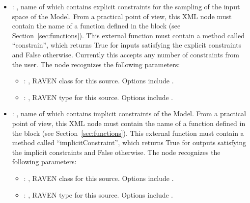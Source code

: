 \begin{itemize}
    \item {}: ,
      name of  which contains explicit constraints for the sampling of
      the input space of the Model. From a practical point of view, this XML node must contain
      the name of a function defined in the  block (see
      Section~\ref{sec:functions}).               This external function must contain a method
      called ``constrain'', which returns True for               inputs satisfying the explicit
      constraints and False otherwise. \nb Currently this accepts any number of constraints from the
      user.
      The  node recognizes the following parameters:
        \begin{itemize}
          \item {}: ,
            RAVEN class for this source. Options include .
          \item {}: ,
            RAVEN type for this source. Options include .
      \end{itemize}

    \item {}: ,
      name of  which contains implicit constraints of the Model. From a practical
      point of view, this XML node must contain the name of a function defined in the
                     block (see Section~\ref{sec:functions}). This external
      function must contain a method called         ``implicitConstraint'', which returns True for
      outputs satisfying the implicit constraints and False otherwise.
      The  node recognizes the following parameters:
        \begin{itemize}
          \item {}: ,
            RAVEN class for this source. Options include .
          \item {}: ,
            RAVEN type for this source. Options include .
      \end{itemize}


\end{itemize}
